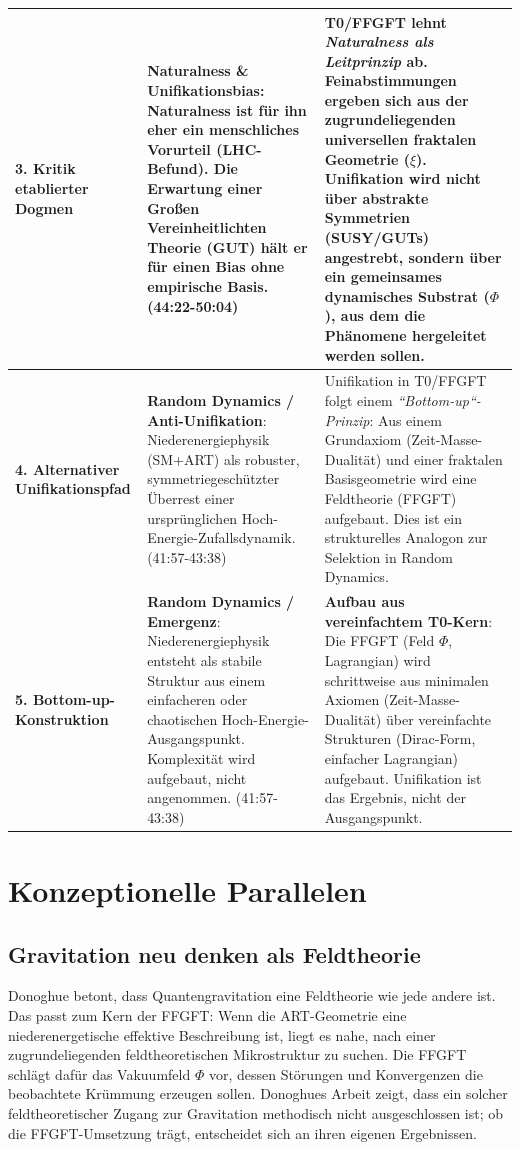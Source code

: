 \begin{longtable}{p{} p{} p{}}
		\textbf{3. Kritik etablierter Dogmen} & 
		\textbf{Naturalness \& Unifikationsbias}: Naturalness ist für ihn eher ein menschliches Vorurteil (LHC-Befund). Die Erwartung einer Großen Vereinheitlichten Theorie (GUT) hält er für einen Bias ohne empirische Basis. \cite{DonoghueInterview2025} (44:22-50:04) & 
		T0/FFGFT lehnt \emph{Naturalness als Leitprinzip} ab. Feinabstimmungen ergeben sich aus der zugrundeliegenden universellen fraktalen Geometrie ($\xi$). Unifikation wird nicht über abstrakte Symmetrien (SUSY/GUTs) angestrebt, sondern über ein gemeinsames dynamisches Substrat ($\Phi$), aus dem die Phänomene hergeleitet werden sollen. \\
		\midrule
		
		\textbf{4. Alternativer Unifikationspfad} & 
		\textbf{Random Dynamics / Anti-Unifikation}: Niederenergiephysik (SM+ART) als robuster, symmetriegeschützter Überrest einer ursprünglichen Hoch-Energie-Zufallsdynamik. \cite{DonoghueInterview2025} (41:57-43:38) & 
		Unifikation in T0/FFGFT folgt einem \emph{``Bottom-up``-Prinzip}: Aus einem Grundaxiom (Zeit-Masse-Dualität) und einer fraktalen Basisgeometrie wird eine Feldtheorie (FFGFT) aufgebaut. Dies ist ein strukturelles Analogon zur Selektion in Random Dynamics. \\
		\midrule
		
		\textbf{5. Bottom-up-Konstruktion} & 
		\textbf{Random Dynamics / Emergenz}: Niederenergiephysik entsteht als stabile Struktur aus einem einfacheren oder chaotischen Hoch-Energie-Ausgangspunkt. Komplexität wird aufgebaut, nicht angenommen. \cite{DonoghueInterview2025} (41:57-43:38) & 
		\textbf{Aufbau aus vereinfachtem T0-Kern}: Die FFGFT (Feld $\Phi$, Lagrangian) wird schrittweise aus minimalen Axiomen (Zeit-Masse-Dualität) über vereinfachte Strukturen (Dirac-Form, einfacher Lagrangian) aufgebaut. Unifikation ist das Ergebnis, nicht der Ausgangspunkt. \\
		
	\end{longtable}
	
	\section{Konzeptionelle Parallelen}
	
	\subsection{Gravitation neu denken als Feldtheorie}
	
	Donoghue betont, dass Quantengravitation eine Feldtheorie wie jede andere ist. Das passt zum Kern der FFGFT: Wenn die ART-Geometrie eine niederenergetische effektive Beschreibung ist, liegt es nahe, nach einer zugrundeliegenden feldtheoretischen Mikrostruktur zu suchen. Die FFGFT schlägt dafür das Vakuumfeld $\Phi$ vor, dessen Störungen und Konvergenzen die beobachtete Krümmung erzeugen sollen. Donoghues Arbeit zeigt, dass ein solcher feldtheoretischer Zugang zur Gravitation methodisch nicht ausgeschlossen ist; ob die FFGFT-Umsetzung trägt, entscheidet sich an ihren eigenen Ergebnissen.
	
